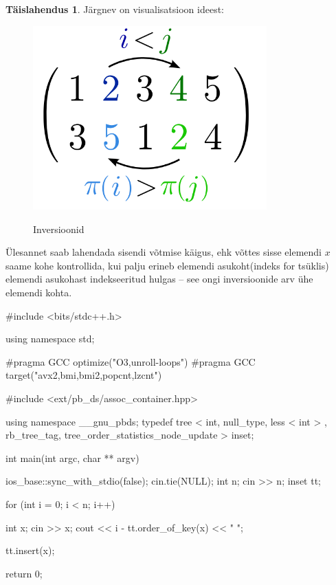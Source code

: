 \documentclass{trkut}
\theoremstyle{definition}
\newtheorem*{solution}{Täislahendus}
\begin{document}
\begin{solution}
Järgnev on visualisatsioon ideest:
\begin{figure}[H]%
    \includegraphics[width=9cm]{inverso.png}%
    \caption{Inversioonid}%
    \label{graaf}%
    \end{figure}
Ülesannet saab lahendada sisendi võtmise käigus, ehk võttes sisse elemendi $x$ saame kohe kontrollida, kui palju erineb elemendi asukoht(indeks for tsüklis) elemendi asukohast indekseeritud hulgas -- see ongi inversioonide arv ühe elemendi kohta.
\end{solution}
\begin{cclol}
#include <bits/stdc++.h>

using namespace std;

#pragma GCC optimize("O3,unroll-loops")
#pragma GCC target("avx2,bmi,bmi2,popcnt,lzcnt")

#include <ext/pb_ds/assoc_container.hpp>

using namespace __gnu_pbds;
typedef tree < int, null_type, less < int > , rb_tree_tag, 
tree_order_statistics_node_update > inset;

int main(int argc, char ** argv) {
  ios_base::sync_with_stdio(false);
  cin.tie(NULL);
  int n;
  cin >> n;
  inset tt;

  for (int i = 0; i < n; i++) {
    int x;
    cin >> x;
    cout << i - tt.order_of_key(x) << " ";

    tt.insert(x);
  }

  return 0;
}
    \end{cclol}
    \begin{kk}[H]
    \caption{Codeforces, Inversions}%
    \end{kk}
\end{document}
